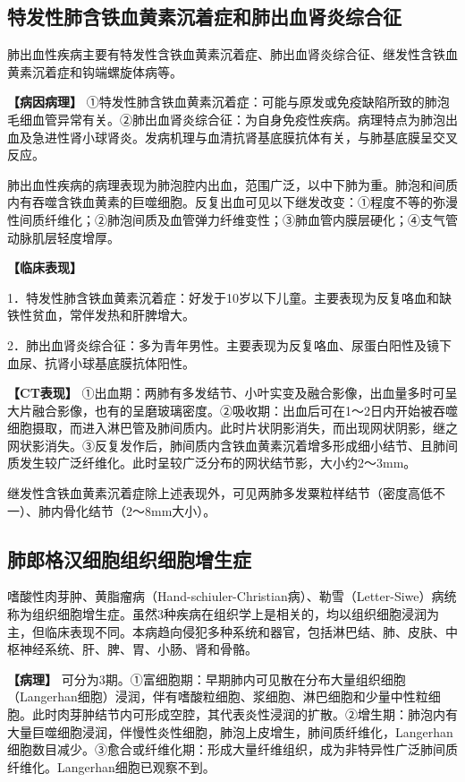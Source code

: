 \subsection{特发性肺含铁血黄素沉着症和肺出血肾炎综合征}

肺出血性疾病主要有特发性含铁血黄素沉着症、肺出血肾炎综合征、继发性含铁血黄素沉着症和钩端螺旋体病等。

\textbf{【病因病理】}
①特发性肺含铁血黄素沉着症：可能与原发或免疫缺陷所致的肺泡毛细血管异常有关。②肺出血肾炎综合征：为自身免疫性疾病。病理特点为肺泡出血及急进性肾小球肾炎。发病机理与血清抗肾基底膜抗体有关，与肺基底膜呈交叉反应。

肺出血性疾病的病理表现为肺泡腔内出血，范围广泛，以中下肺为重。肺泡和间质内有吞噬含铁血黄素的巨噬细胞。反复出血可见以下继发改变：①程度不等的弥漫性间质纤维化；②肺泡间质及血管弹力纤维变性；③肺血管内膜层硬化；④支气管动脉肌层轻度增厚。

\textbf{【临床表现】}

1．特发性肺含铁血黄素沉着症：好发于10岁以下儿童。主要表现为反复咯血和缺铁性贫血，常伴发热和肝脾增大。

2．肺出血肾炎综合征：多为青年男性。主要表现为反复咯血、尿蛋白阳性及镜下血尿、抗肾小球基底膜抗体阳性。

\textbf{【CT表现】}
①出血期：两肺有多发结节、小叶实变及融合影像，出血量多时可呈大片融合影像，也有的呈磨玻璃密度。②吸收期：出血后可在1～2日内开始被吞噬细胞摄取，而进入淋巴管及肺间质内。此时片状阴影消失，而出现网状阴影，继之网状影消失。③反复发作后，肺间质内含铁血黄素沉着增多形成细小结节、且肺间质发生较广泛纤维化。此时呈较广泛分布的网状结节影，大小约2～3mm。

继发性含铁血黄素沉着症除上述表现外，可见两肺多发粟粒样结节（密度高低不一）、肺内骨化结节（2～8mm大小）。

\subsection{肺郎格汉细胞组织细胞增生症}

嗜酸性肉芽肿、黄脂瘤病（Hand-schiuler-Christian病）、勒雪（Letter-Siwe）病统称为组织细胞增生症。虽然3种疾病在组织学上是相关的，均以组织细胞浸润为主，但临床表现不同。本病趋向侵犯多种系统和器官，包括淋巴结、肺、皮肤、中枢神经系统、肝、脾、胃、小肠、肾和骨骼。

\textbf{【病理】}
可分为3期。①富细胞期：早期肺内可见散在分布大量组织细胞（Langerhan细胞）浸润，伴有嗜酸粒细胞、浆细胞、淋巴细胞和少量中性粒细胞。此时肉芽肿结节内可形成空腔，其代表炎性浸润的扩散。②增生期：肺泡内有大量巨噬细胞浸润，伴慢性炎性细胞，肺泡上皮增生，肺间质纤维化，Langerhan细胞数目减少。③愈合或纤维化期：形成大量纤维组织，成为非特异性广泛肺间质纤维化。Langerhan细胞已观察不到。

